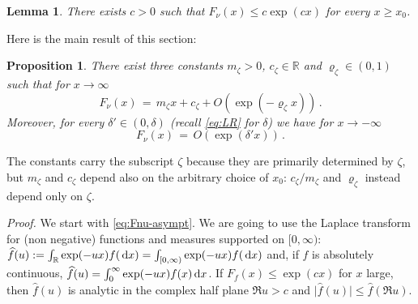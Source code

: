 \documentclass[reqno,11pt]{amsart}
\numberwithin{equation}{section}
\newtheorem{lemma}[theorem]{Lemma}
\newtheorem{proposition}[theorem]{Proposition}
\newcommand{\dd}{\,\text{\rm d}}             %
\newcommand{\bbR}{{\ensuremath{\mathbb R}} }
\newcommand{\gd}{\delta}
\newcommand{\gz}{\zeta}
\begin{document}
\medskip

\begin{lemma}
\label{th:pre-bound}
There exists $c>0$ such that $F_\nu (x) \le c \exp(c x)$
for every $x\ge x_0$. 
\end{lemma}

\medskip


Here is the main result of this section:
\medskip

\begin{proposition}
\label{th:Fnu-asympt}
There exist three constants $m_\gz>0$, $c_\gz \in \bbR$  and $\varrho_\gz\in (0,1)$ such that for $x \to \infty$
\begin{equation}
\label{eq:Fnu-asympt}
F_\nu(x)\, =\, m_\gz x + c_ \gz + O\left( \exp(-\varrho_\gz x) \right)\, .
\end{equation}
Moreover, for every $\gd' \in (0 , \gd)$ (recall \eqref{eq:LR} for $\gd$) 
we have for $x \to -\infty$
\begin{equation}
\label{eq:Fnu-asympt2}
F_\nu(x)\, =\, O\left( \exp(\gd' x) \right)\, .
\end{equation}

\end{proposition}

\medskip

The constants carry the subscript $\gz$ because they are primarily determined by $\gz$, but $m_\gz$ and  $c_\gz$  depend also on the arbitrary choice of $x_0$:
$c_\gz/m_\gz$ and $\varrho_\gz$ instead depend only on $\gz$. 


\medskip

\emph{Proof.} We start with \eqref{eq:Fnu-asympt}.
We are going to use the Laplace transform for (non negative) functions and measures supported on $[0, \infty)$:
$\widehat f(u) :=  \int_\bbR \exp(-ux) f(\dd x)=\int_{[0,\infty)} \exp(-ux) f(\dd x)$ and, if $f$ is absolutely continuous,
$\widehat f(u) = \int_0^\infty  \exp(-ux) f(x) \dd x$. 
If $F_f(x) \le \exp(c x)$ for $x$ large, then  $\widehat f(u)$ is analytic in the complex half  plane $ \Re u>c$ and $\vert \widehat f (u) \vert \le \widehat f  ( \Re u)$. 
\end{document}
